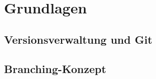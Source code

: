 
\section{Grundlagen}
\label{sec:grundlagen}




\subsection{Versionsverwaltung und Git}
\label{sec:grundlagen:git}

\lipsum[1]




\subsection{Branching-Konzept}
\label{sec:grundlagen:branching}

\lipsum[1]
